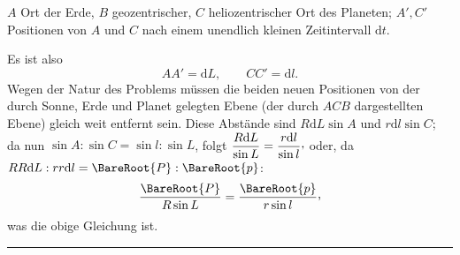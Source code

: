 \(A\) Ort der Erde, \(B\) geozentrischer, \(C\) heliozentrischer Ort des Planeten; \(A',C'\) Positionen von \(A\) und \(C\) nach einem unendlich kleinen Zeitintervall \(\mathrm{d}t\).

Es ist also
\[
AA'=\mathrm{d}L,\qquad CC'=\mathrm{d}l.
\]
Wegen der Natur des Problems müssen die beiden neuen Positionen von der durch Sonne, Erde und Planet gelegten Ebene (der durch \(ACB\) dargestellten Ebene) gleich weit entfernt sein. Diese Abstände sind \(R\mathrm{d}L\sin A\) und \(r\mathrm{d}l\sin C\); da nun \(\sin A:\sin C=\sin l:\sin L\), folgt \(\dfrac{R\mathrm{d}L}{\sin L}=\dfrac{r\mathrm{d}l}{\sin l}\mathpunct{\raisebox{.45ex}{,}}\) oder, da \(RR\mathrm{d}L:rr\mathrm{d}l=\BareRoot{P}:\BareRoot{p}\):
\[
\frac{\BareRoot{P}}{R\sin L}=\frac{\BareRoot{p}}{r\sin l}\mathpunct{\raisebox{.45ex}{,}}
\]
was die obige Gleichung ist.
\begin{center}\rule{.18\textwidth}{.35pt}\end{center}
